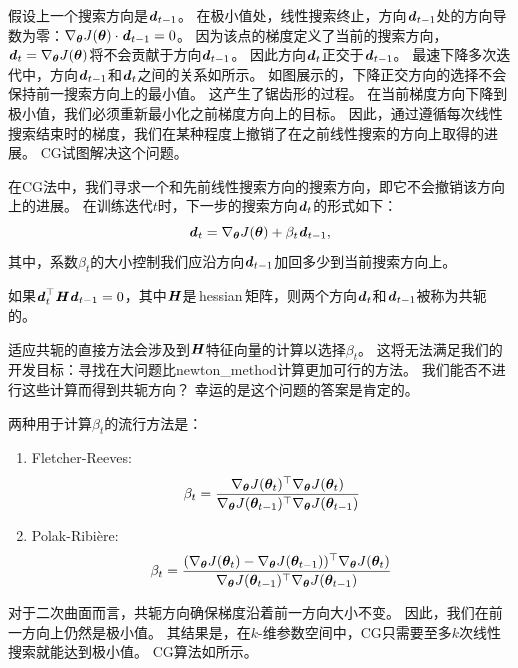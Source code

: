 
假设上一个搜索方向是$\boldsymbol{\mathit{d}}_{t-1}$。   
在极小值处，线性搜索终止，方向$\boldsymbol{\mathit{d}}_{t-1}$处的方向导数为零：$\nabla_{\boldsymbol{\theta}} J(\boldsymbol{\theta}) \cdot \boldsymbol{\mathit{d}}_{t-1} = 0$。
因为该点的梯度定义了当前的搜索方向，$\boldsymbol{\mathit{d}}_t = \nabla_{\boldsymbol{\theta}} J(\boldsymbol{\theta})$将不会贡献于方向$\boldsymbol{\mathit{d}}_{t-1}$。
因此方向$\boldsymbol{\mathit{d}}_t$正交于$\boldsymbol{\mathit{d}}_{t-1}$。
最速下降多次迭代中，方向$\boldsymbol{\mathit{d}}_{t-1}$和$\boldsymbol{\mathit{d}}_t$之间的关系如所示。
如图展示的，下降正交方向的选择不会保持前一搜索方向上的最小值。
这产生了锯齿形的过程。
在当前梯度方向下降到极小值，我们必须重新最小化之前梯度方向上的目标。
因此，通过遵循每次线性搜索结束时的梯度，我们在某种程度上撤销了在之前线性搜索的方向上取得的进展。
\gls{CG}试图解决这个问题。

在\gls{CG}法中，我们寻求一个和先前线性搜索方向的搜索方向，即它不会撤销该方向上的进展。
在训练迭代$t$时，下一步的搜索方向$\boldsymbol{\mathit{d}}_t$的形式如下：
\begin{equation}
    \boldsymbol{\mathit{d}}_t = \nabla_{\boldsymbol{\theta}} J(\boldsymbol{\theta}) + \beta_t \boldsymbol{\mathit{d}}_{t-1},
\end{equation}
其中，系数$\beta_t$的大小控制我们应沿方向$\boldsymbol{\mathit{d}}_{t-1}$加回多少到当前搜索方向上。


如果$\boldsymbol{\mathit{d}}_t^\top \boldsymbol{\mathit{H}} \boldsymbol{\mathit{d}}_{t-1} = 0$，其中$\boldsymbol{\mathit{H}}$是\,\gls{hessian}\,矩阵，则两个方向$\boldsymbol{\mathit{d}}_t$和$\boldsymbol{\mathit{d}}_{t-1}$被称为共轭的。

适应共轭的直接方法会涉及到$\boldsymbol{\mathit{H}}$特征向量的计算以选择$\beta_t$。
这将无法满足我们的开发目标：寻找在大问题比\gls{newton_method}计算更加可行的方法。
我们能否不进行这些计算而得到共轭方向？
幸运的是这个问题的答案是肯定的。

两种用于计算$\beta_t$的流行方法是：
\begin{enumerate}
\item Fletcher-Reeves:
\begin{equation}
    \beta_t = \frac{ \nabla_{\boldsymbol{\theta}} J(\boldsymbol{\theta}_t)^\top \nabla_{\boldsymbol{\theta}} J(\boldsymbol{\theta}_t) }
{ \nabla_{\boldsymbol{\theta}} J(\boldsymbol{\theta}_{t-1})^\top \nabla_{\boldsymbol{\theta}} J(\boldsymbol{\theta}_{t-1}) }
\end{equation}

\item Polak-Ribi\`{e}re:
\begin{equation}
    \beta_t = \frac{ (\nabla_{\boldsymbol{\theta}} J(\boldsymbol{\theta}_t) - \nabla_{\boldsymbol{\theta}} J(\boldsymbol{\theta}_{t-1}))^\top \nabla_{\boldsymbol{\theta}} J(\boldsymbol{\theta}_t) }
{ \nabla_{\boldsymbol{\theta}} J(\boldsymbol{\theta}_{t-1})^\top \nabla_{\boldsymbol{\theta}} J(\boldsymbol{\theta}_{t-1}) }
\end{equation}
\end{enumerate}
对于二次曲面而言，共轭方向确保梯度沿着前一方向大小不变。
因此，我们在前一方向上仍然是极小值。
其结果是，在$k$-维参数空间中，\gls{CG}只需要至多$k$次线性搜索就能达到极小值。
\gls{CG}算法如所示。

